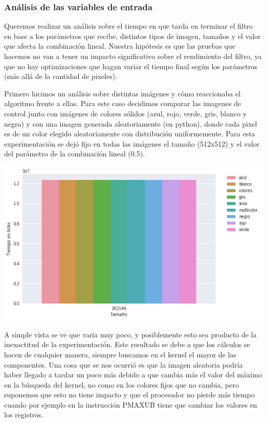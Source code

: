 \subsubsection*{Análisis de las variables de entrada}

Queremos realizar un análisis sobre el tiempo en que tarda en terminar el filtro en base a los parámetros que recibe, distintos tipos de imagen, tamaños y el valor que afecta la combinación lineal. Nuestra hipótesis es que las pruebas que hacemos no van a tener un impacto significativo sobre el rendimiento del filtro, ya que no hay optimizaciones que hagan variar el tiempo final según los parámetros (más allá de la cantidad de pixeles).

Primero hicimos un análisis sobre distintas imágenes y cómo reaccionaba el algoritmo frente a ellas. Para este caso decidimos comparar las imagenes de control junto con imágenes de colores sólidos (azul, rojo, verde, gris, blanco y negro) y con una imagen generada aleatoriamente (en python), donde cada pixel es de un color elegido aleatoriamente con distribución uniformemente. Para esta experimentación se dejó fijo en todas las imágenes el tamaño (512x512) y el valor del parámetro de la combinación lineal (0.5).

\begin{center} 
	\includegraphics[scale=0.5]{img/maxCloser_PARAM_IMG.png}
\end{center}

A simple vista se ve que varía muy poco, y posiblemente esto sea producto de la inexactitud de la experimentación. Este resultado se debe a que los cálculos se hacen de cualquier manera, siempre buscamos en el kernel el mayor de las componentes. Una cosa que se nos ocurrió es que la imagen aleatoria podría haber llegado a tardar un poco más debido a que cambia más el valor del máximo en la búsqueda del kernel, no como en los colores fijos que no cambia, pero suponemos que esto no tiene impacto y que el procesador no pierde más tiempo cuando por ejemplo en la instrucción PMAXUB tiene que cambiar los valores en los registros.

